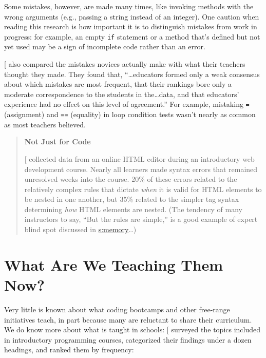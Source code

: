 Some mistakes, however, are made many times, like invoking methods with
the wrong arguments (e.g., passing a string instead of an integer). One
caution when reading this research is how important it is to distinguish
mistakes from work in progress: for example, an empty \texttt{if} statement or
a method that's defined but not yet used may be a sign of incomplete
code rather than an error.

{[}\protect[\hyperlink{b:Brow2017}{Brow2017}]{]} also compared the mistakes novices actually make with
what their teachers thought they made. They found that,
``\ldots{}educators formed only a weak consensus about which
mistakes are most frequent, that their rankings bore only a moderate
correspondence to the students in the\ldots{}data, and that
educators' experience had no effect on this level of agreement.'' For
example, mistaking \texttt{=} (assignment) and \texttt{==} (equality) in loop
condition tests wasn't nearly as common as most teachers believed.

\begin{quote}\setlength{\parindent}{0pt}
\textbf{Not Just for Code}

{[}\protect[\hyperlink{b:Park2015}{Park2015}]{]} collected data from an online HTML editor during an
introductory web development course. Nearly all learners made syntax
errors that remained unresolved weeks into the course. 20\% of these
errors related to the relatively complex rules that dictate \emph{when} it
is valid for HTML elements to be nested in one another, but 35\%
related to the simpler tag syntax determining \emph{how} HTML elements are
nested. (The tendency of many instructors to say, ``But the rules are
simple,'' is a good example of expert blind spot discussed in
\protect\hyperlink{CHAPTER}{s:memory}\ldots{})
\end{quote}

\section{What Are We Teaching Them Now?}\label{s:pck-now}

Very little is known about what coding bootcamps and other free-range
initiatives teach, in part because many are reluctant to share their
curriculum. We do know more about what is taught in schools:
{[}\protect[\hyperlink{b:Luxt2017}{Luxt2017}]{]} surveyed the topics included in introductory
programming courses, categorized their findings under a dozen headings,
and ranked them by frequency:

